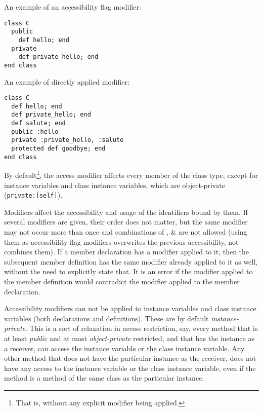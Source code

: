 \example An example of an accessibility flag modifier:
\begin{lstlisting}
class C
  public
    def hello; end
  private
    def private_hello; end
end class
\end{lstlisting}

\example An example of directly applied modifier:
\begin{lstlisting}
class C
  def hello; end
  def private_hello; end
  def salute; end
  public :hello
  private :private_hello, :salute
  protected def goodbye; end
end class
\end{lstlisting}

By default\footnote{That is, without any explicit modifier being applied.}, the  access modifier affects every member of the class type, except for instance variables and class instance variables, which are object-private (\lstinline!private:[self]!). 

Modifiers affect the accessibility and usage of the identifiers bound by them. If several modifiers are given, their order does not matter, but the same modifier may not occur more than once and combinations of ,  \&  are not allowed (using them as accessibility flag modifiers overwrites the previous accessibility, not combines them). If a member declaration has a modifier applied to it, then the subsequent member definition has the same modifier already applied to it as well, without the need to explicitly state that. It is an error if the modifier applied to the member definition would contradict the modifier applied to the member declaration. 

Accessibility modifiers can not be applied to instance variables and class instance variables (both declarations and definitions). These are by default {\em instance-private}. This is a sort of relaxation in access restriction, say, every method that is at least {\em public} and at most {\em object-private} restricted, and that has the instance as a receiver, can access the instance variable or the class instance variable. Any other method that does not have the particular instance as the receiver, does not have any access to the instance variable or the class instance variable, even if the method is a method of the same class as the particular instance. 

